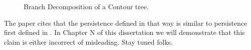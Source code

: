 \begin{figure}%
    \centering
    \qquad
    \caption{Branch Decomposition of a Contour tree.}%
    \label{fig:branch-decomp}%
\end{figure}




The paper \cite{ct-branch-decomp} cites that the persistence defined in that way is similar to persistence first defined in \cite{persistence-original}. In Chapter N of this dissertation we will demonstrate that this claim is either incorrect of misleading. Stay tuned folks.

